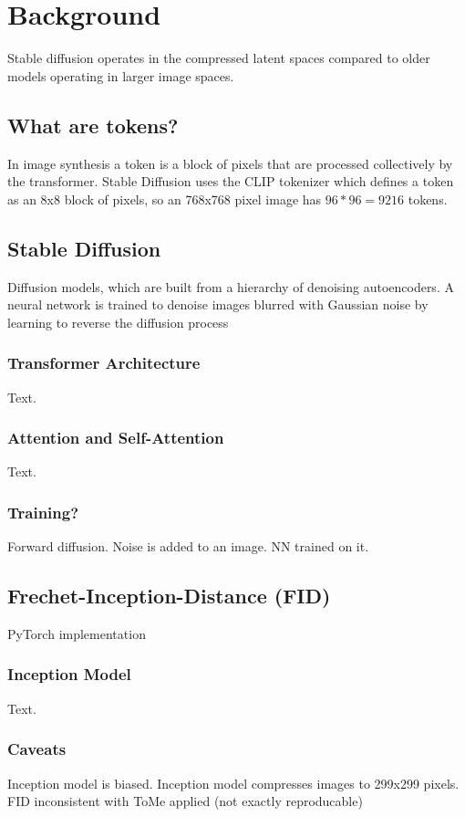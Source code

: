 \section{Background}
Stable diffusion operates in the compressed latent spaces compared to older models operating in larger image spaces.

\subsection{What are tokens?}
In image synthesis a token is a block of pixels that are processed collectively by the transformer. Stable Diffusion uses the CLIP tokenizer\cite{radford2021learning} which defines a token as an 8x8 block of pixels, so an 768x768 pixel image has \(96*96=9216\) tokens.

\subsection{Stable Diffusion}
Diffusion models, which are built from a hierarchy of
denoising autoencoders. A neural network is trained to denoise images blurred with Gaussian noise by learning to reverse the diffusion process

\subsubsection{Transformer Architecture}
Text.

\subsubsection{Attention and Self-Attention}
Text.

\subsubsection{Training?}
Forward diffusion. Noise is added to an image. NN trained on it.

\subsection{Frechet-Inception-Distance (FID)}
PyTorch implementation \cite{Seitzer2020FID}

\subsubsection{Inception Model}
Text.

\subsubsection{Caveats}
Inception model is biased. Inception model compresses images to 299x299 pixels. FID inconsistent with ToMe applied (not exactly reproducable)